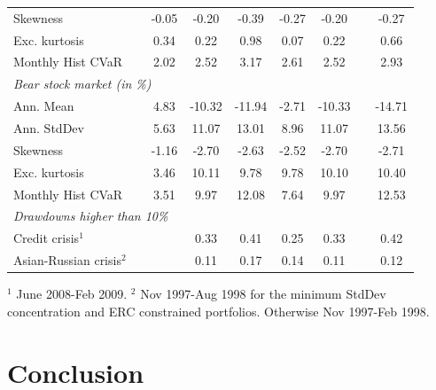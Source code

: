 \documentclass[12pt,a4paper]{article}
\begin{document}
\begin{table}[tb]
\begin{center}
{\begin{tabular}{|lc c  cccc c cc| }
  \multicolumn{2}{|l}{Skewness }       &      &  -0.05 & -0.20 & -0.39 & -0.27 & -0.20 && -0.27   \\
    \multicolumn{2}{|l}{Exc. kurtosis }   &     & 0.34 &0.22 & 0.98 & 0.07 & 0.22 & & 0.66 \\
 \multicolumn{2}{|l}{Monthly Hist  CVaR}   &    &  2.02 & 2.52 & 3.17 & 2.61 & 2.52 & & 2.93 \\ \hline
 \multicolumn{10}{|l|}{\emph{Bear stock market (in \%)}} \\
 \multicolumn{2}{|l}{Ann. Mean  }    &       & 4.83  & -10.32 & -11.94 & -2.71 & -10.33 && -14.71 \\
 \multicolumn{2}{|l}{Ann. StdDev}     &       & 5.63 & 11.07 & 13.01 & 8.96 & 11.07 & & 13.56       \\
  \multicolumn{2}{|l}{Skewness}     &         & -1.16  & -2.70 & -2.63 & -2.52 & -2.70 && -2.71 \\
    \multicolumn{2}{|l}{Exc. kurtosis}   &     &3.46 & 10.11& 9.78 & 9.78 & 10.10 &  & 10.40     \\
 \multicolumn{2}{|l}{Monthly Hist  CVaR}   &	 & 3.51 & 9.97& 12.08 & 7.64 & 9.97 &  & 12.53 \\ \hline
\multicolumn{10}{|l|}{ \emph{Drawdowns higher than 10\%}  }  \\
 \multicolumn{2}{|l}{Credit crisis$^{1}$}       &   &  &  0.33 & 0.41 & 0.25 & 0.33 &  & 0.42  \\
 \multicolumn{2}{|l}{Asian-Russian crisis$^{2}$}&  & &  0.11   & 0.17 & 0.14 &0.11 & & 0.12 \\  \hline
\end{tabular}
}
\end{center}

{\scriptsize $^{1}$  June 2008-Feb 2009.  $^{2}$  Nov 1997-Aug 1998 for the minimum StdDev concentration and ERC constrained portfolios. Otherwise Nov 1997-Feb 1998.  }
\end{table}

\clearpage

\section{Conclusion \label{sec:Conclusion}}
\end{document}
